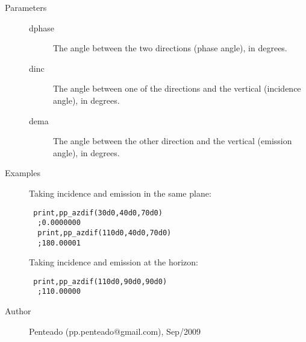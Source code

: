 \begin{description}
\item[Parameters]\hspace*{0em} \newline
\begin{description}

\item[dphase]\hspace*{1em} {\footnotesize {}  } \newline       The angle between the two directions (phase angle), in degrees.
 
 

\item[dinc]\hspace*{1em} {\footnotesize {}  } \newline       The angle between one of the directions and the vertical (incidence angle), in degrees.
 
 

\item[dema]\hspace*{1em} {\footnotesize {}  } \newline       The angle between the other direction and the vertical (emission angle), in degrees.
 
 
 

\end{description}
\end{description}





\begin{description}
\item[Examples]\hspace*{0em} \newline     Taking incidence and emission in the same plane:
 \begin{verbatim} print,pp_azdif(30d0,40d0,70d0)
  ;0.0000000
  print,pp_azdif(110d0,40d0,70d0)
  ;180.00001
 \end{verbatim}    Taking incidence and emission at the horizon:
 \begin{verbatim} print,pp_azdif(110d0,90d0,90d0)
  ;110.00000
 \end{verbatim}
 
\end{description}



\begin{description}

\item[Author]\hspace*{0em} \newlinePaulo Penteado (pp.penteado@gmail.com), Sep/2009









\end{description}



